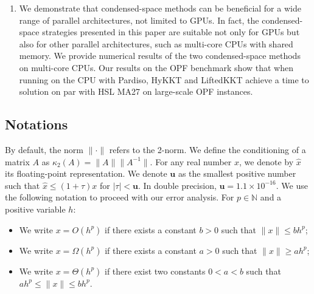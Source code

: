 \documentclass[smallextended]{svjour3}
\newcommand{\cond}{\kappa_2}
\newcommand{\epstol}{\mathbf{u}}
\newcommand{\add}[1]{#1}
\begin{document}
\begin{enumerate}
\item We demonstrate that condensed-space methods can be beneficial for a wide range of parallel architectures, not limited to GPUs. In fact, the condensed-space strategies presented in this paper are suitable not only for GPUs but also for other parallel architectures, such as multi-core CPUs with shared memory. We provide numerical results of the two condensed-space methods on multi-core CPUs. \add{Our results on the OPF benchmark show that when running on the CPU with Pardiso,
  HyKKT and LiftedKKT achieve a time to solution on par with HSL MA27 on large-scale OPF instances.}
\end{enumerate}

\subsection{Notations}
By default, the norm $\|\cdot\|$ refers to the 2-norm.
We define the conditioning of a matrix $A$ as $\cond(A) = \| A \| \|A^{-1} \|$.
For any real number $x$, we denote by $\widehat{x}$ its floating-point representation.
We denote $\epstol$ as the smallest positive number such that $\widehat{x} \leq (1 + \tau) x$ for $|\tau| < \epstol$.
In double precision, $\epstol = 1.1 \times 10^{-16}$.
We use the following notation to proceed with our error analysis.
For $p \in \mathbb{N}$ and a positive variable $h$:
\begin{itemize}
  \item We write $x = O(h^p)$ if there exists a constant $b > 0$ such that $\| x \| \leq b h^p$;
  \item We write $x = \Omega(h^p)$ if there exists a constant $a > 0$ such that $\| x \| \geq a h^p$;
  \item We write $x = \Theta(h^p)$ if there exist two constants $0 < a < b$ such that $a h^p \leq \| x \| \leq b h^p$.
\end{itemize}
\end{document}
